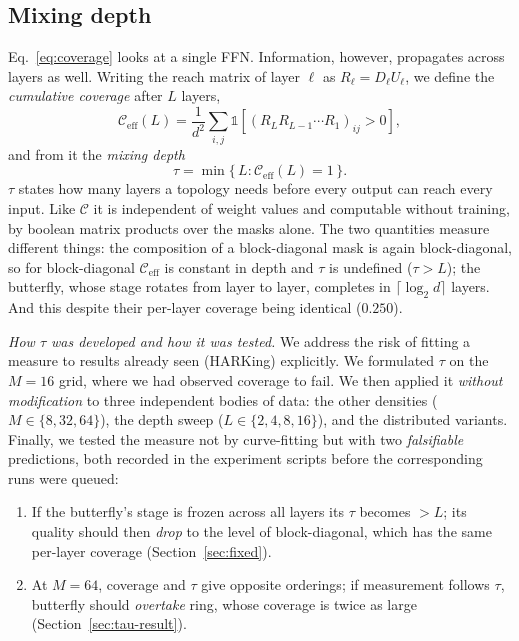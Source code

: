 \documentclass[10pt,journal]{IEEEtran}
\begin{document}
\subsection{Mixing depth}
\label{sec:tau}
Eq.~\eqref{eq:coverage} looks at a single FFN. Information, however, propagates across layers
as well. Writing the reach matrix of layer $\ell$ as $R_\ell = D_\ell U_\ell$, we define the
\emph{cumulative coverage} after $L$ layers,
\begin{equation}
\label{eq:ceff}
\mathcal{C}_{\mathrm{eff}}(L) = \frac{1}{d^2}\sum_{i,j}
  \mathbb{1}\!\left[\left(R_L R_{L-1}\cdots R_1\right)_{ij} > 0\right],
\end{equation}
and from it the \emph{mixing depth}
\begin{equation}
\label{eq:tau}
\tau = \min\{\,L : \mathcal{C}_{\mathrm{eff}}(L) = 1\,\}.
\end{equation}
$\tau$ states how many layers a topology needs before every output can reach every input. Like
$\mathcal{C}$ it is independent of weight values and computable without training, by boolean
matrix products over the masks alone. The two quantities measure different things: the
composition of a block-diagonal mask is again block-diagonal, so for block-diagonal
$\mathcal{C}_{\mathrm{eff}}$ is constant in depth and $\tau$ is undefined ($\tau>L$); the
butterfly, whose stage rotates from layer to layer, completes in
$\lceil \log_2 d \rceil$ layers. And this despite their per-layer coverage being identical
($0.250$).

\emph{How $\tau$ was developed and how it was tested.} We address the risk of fitting a measure
to results already seen (HARKing) explicitly. We formulated $\tau$ on the $M{=}16$ grid, where
we had observed coverage to fail. We then applied it \emph{without modification} to three
independent bodies of data: the other densities ($M \in \{8,32,64\}$), the depth sweep
($L \in \{2,4,8,16\}$), and the distributed variants. Finally, we tested the measure not by
curve-fitting but with two \emph{falsifiable} predictions, both recorded in the experiment
scripts before the corresponding runs were queued:

\begin{enumerate}
\item If the butterfly's stage is frozen across all layers its $\tau$ becomes $>L$; its quality
should then \emph{drop} to the level of block-diagonal, which has the same per-layer coverage
(Section~\ref{sec:fixed}).
\item At $M{=}64$, coverage and $\tau$ give opposite orderings; if measurement follows $\tau$,
butterfly should \emph{overtake} ring, whose coverage is twice as large
(Section~\ref{sec:tau-result}).
\end{enumerate}
\end{document}
